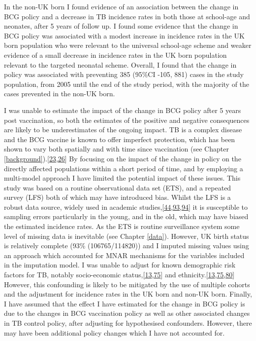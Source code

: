 \documentclass[11pt,twoside]{bristolthesis}
\begin{document}
  In the non-UK born I found evidence of an association between the change in BCG policy and a decrease in TB incidence rates in both those at school-age and neonates, after 5 years of follow up. I found some evidence that the change in BCG policy was associated with a modest increase in incidence rates in the UK born population who were relevant to the universal school-age scheme and weaker evidence of a small decrease in incidence rates in the UK born population relevant to the targeted neonatal scheme. Overall, I found that the change in policy was associated with preventing 385 (95\%CI -105, 881) cases in the study population, from 2005 until the end of the study period, with the majority of the cases prevented in the non-UK born.
  
  I was unable to estimate the impact of the change in BCG policy after 5 years post vaccination, so both the estimates of the positive and negative consequences are likely to be underestimates of the ongoing impact. TB is a complex disease and the BCG vaccine is known to offer imperfect protection, which has been shown to vary both spatially and with time since vaccination (see Chapter \ref{background}).{[}\protect\hyperlink{ref-Mangtani2014a}{23},\protect\hyperlink{ref-Abubakar2013}{26}{]} By focusing on the impact of the change in policy on the directly affected populations within a short period of time, and by employing a multi-model approach I have limited the potential impact of these issues. This study was based on a routine observational data set (ETS), and a repeated survey (LFS) both of which may have introduced bias. Whilst the LFS is a robust data source, widely used in academic studies,{[}\protect\hyperlink{ref-French2007}{44},\protect\hyperlink{ref-Davies2016a}{93},\protect\hyperlink{ref-Lindley2009}{94}{]} it is susceptible to sampling errors particularly in the young, and in the old, which may have biased the estimated incidence rates. As the ETS is routine surveillance system some level of missing data is inevitable (see Chapter \ref{data}). However, UK birth status is relatively complete (93\% (106765/114820)) and I imputed missing values using an approach which accounted for MNAR mechanisms for the variables included in the imputation model. I was unable to adjust for known demographic risk factors for TB, notably socio-economic status,{[}\protect\hyperlink{ref-Bhatti1995}{13},\protect\hyperlink{ref-Parslow2001}{75}{]} and ethnicity.{[}\protect\hyperlink{ref-Bhatti1995}{13},\protect\hyperlink{ref-Parslow2001}{75},\protect\hyperlink{ref-Abubakar2008}{80}{]} However, this confounding is likely to be mitigated by the use of multiple cohorts and the adjustment for incidence rates in the UK born and non-UK born. Finally, I have assumed that the effect I have estimated for the change in BCG policy is due to the changes in BCG vaccination policy as well as other associated changes in TB control policy, after adjusting for hypothesised confounders. However, there may have been additional policy changes which I have not accounted for.
  
\end{document}
